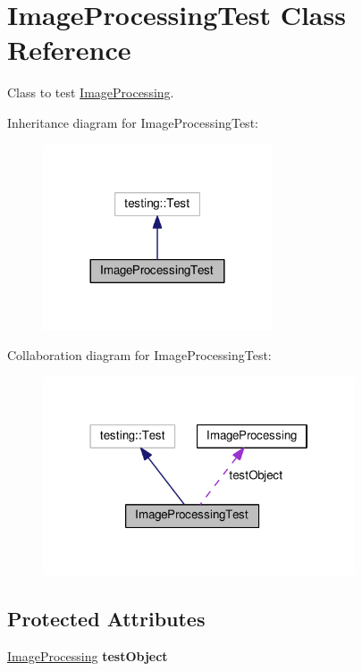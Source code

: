 \hypertarget{classImageProcessingTest}{}\section{Image\+Processing\+Test Class Reference}
\label{classImageProcessingTest}


Class to test \hyperlink{classImageProcessing}{Image\+Processing}.  




Inheritance diagram for Image\+Processing\+Test\+:
\nopagebreak
\begin{figure}[H]
\begin{center}
\leavevmode
\includegraphics[width=192pt]{classImageProcessingTest__inherit__graph}
\end{center}
\end{figure}


Collaboration diagram for Image\+Processing\+Test\+:
\nopagebreak
\begin{figure}[H]
\begin{center}
\leavevmode
\includegraphics[width=262pt]{classImageProcessingTest__coll__graph}
\end{center}
\end{figure}
\subsection*{Protected Attributes}
\begin{DoxyCompactItemize}
\item 
\hyperlink{classImageProcessing}{Image\+Processing} {\bfseries test\+Object}\hypertarget{classImageProcessingTest_a209398691b93a4f2d8482fc7b642c5e4}{}\label{classImageProcessingTest_a209398691b93a4f2d8482fc7b642c5e4}

\end{DoxyCompactItemize}


